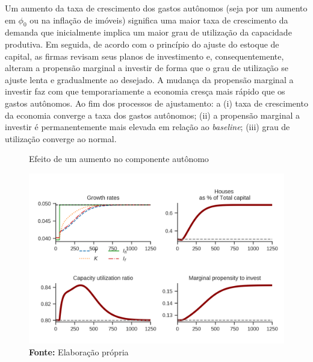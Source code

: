 
Um aumento da taxa de crescimento dos gastos autônomos (seja por um aumento em $\phi_0$ ou na inflação de imóveis) significa uma maior taxa de crescimento da demanda que inicialmente implica um maior grau de utilização da capacidade produtiva. Em seguida, de acordo com o princípio do ajuste do estoque de capital, as firmas revisam seus planos de investimento e, consequentemente, alteram a propensão marginal a investir de forma que o grau de utilização se ajuste lenta e gradualmente ao desejado. A mudança da propensão marginal a investir faz com que temporariamente a economia cresça mais rápido que os gastos autônomos. Ao fim dos processos de ajustamento: a (i) taxa de crescimento da economia converge a taxa dos gastos autônomos; (ii) a propensão marginal a investir é permanentemente mais elevada em relação ao \textit{baseline}; (iii) grau de utilização converge ao normal.



\begin{figure}[H]
	\centering
	\caption{Efeito de um aumento no componente autônomo}
	\label{choque_1}
	\includegraphics{../../Modelo/Versoes/Shock_1.png}
	\caption*{\textbf{Fonte:} Elaboração própria}
\end{figure}


